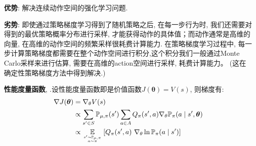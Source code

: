 \documentclass{article}
\begin{document}
        \textbf{优势}: 解决连续动作空间的强化学习问题.

        \textbf{劣势}:
            即使通过策略梯度学习得到了随机策略之后, 在每一步行为时, 我们还需要对得到的最优策略概率分布进行采样, 才能获得动作的具体值；而动作通常是高维的向量, 在高维的动作空间的频繁采样很耗费计算能力. 在策略梯度学习过程中, 每一步计算策略梯度都需要在整个动作空间进行积分,这个积分我们一般通过Monte Carlo采样来进行估算, 需要在高维的action空间进行采样, 耗费计算能力。 (这在确定性策略梯度方法中得到解决.)

        \textbf{性能度量函数}, .设性能度量函数即是价值函数$J(\boldsymbol{\theta}) = V(s)$, 则梯度有:
            \begin{align*}
                \nabla J(\boldsymbol{\theta}) &= \nabla_\theta V(s) \\
                &\propto \sum\limits_{s' \in S} \mathbb P_{\mu, \pi}(s') \sum\limits_{a \in A} Q_{\pi}(s', a) \nabla_{\theta} \mathbb{P}_\pi(a \mid s', \boldsymbol{\theta}) \\
                & \propto \underset{s' \sim \mathbb P_{\mu, \pi} \atop a \sim \pi}{\mathbb E} \left[Q_{\pi}(s', a)\  \nabla_\theta \ln \mathbb{P}_\pi (a \mid s') \right]
            \end{align*}
        
\end{document}
